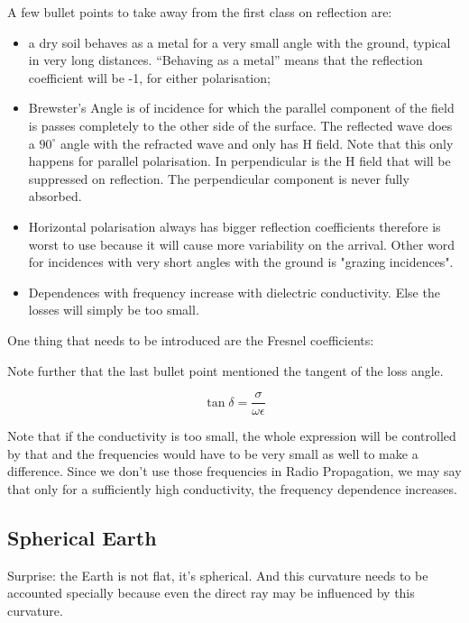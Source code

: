 A few bullet points to take away from the first class on reflection are:
\begin{itemize}
    \item a dry soil behaves as a metal for a very small angle with the ground, typical in very long distances. ``Behaving as a metal'' means that the reflection coefficient will be -1, for either polarisation;
    \item Brewster's Angle is of incidence for which the parallel component of the field is passes completely to the other side of the surface. The reflected wave does a $90^{\circ}$ angle with the refracted wave and only has H field. Note that this only happens for parallel polarisation. In perpendicular is the H field that will be suppressed on reflection. The perpendicular component is never fully absorbed. 
    \item Horizontal polarisation always has bigger reflection coefficients therefore is worst to use because it will cause more variability on the arrival. Other word for incidences with very short angles with the ground is "grazing incidences".
    \item Dependences with frequency increase with dielectric conductivity. Else the losses will simply be too small.
\end{itemize}

One thing that needs to be introduced are the Fresnel coefficients:


Note further that the last bullet point mentioned the tangent of the loss angle.

\begin{equation}
    \tan \delta = \frac{\sigma}{\omega \epsilon}
\end{equation}

Note that if the conductivity is too small, the whole expression will be controlled by that and the frequencies would have to be very small as well to make a difference. Since we don't use those frequencies in Radio Propagation, we may say that only for a sufficiently high conductivity, the frequency dependence increases.


\subsection{Spherical Earth}

Surprise: the Earth is not flat, it's spherical. And this curvature needs to be accounted specially because even the direct ray may be influenced by this curvature.

